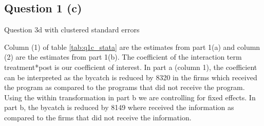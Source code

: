 \documentclass{article}
\begin{document}
\newpage

\subsection{Question 1 (c)}
\begin{table}[ht]
    \centering
    
    \caption{Question 3d with clustered standard errors }
    \label{tab:q1c_stata}
\end{table}
Column (1) of table \ref{tab:q1c_stata} are the estimates from part 1(a) and column (2) are the estimates from part 1(b). The coefficient of the interaction term treatment*post is our coefficient of interest. In part a (column 1), the coefficient can be interpreted as the bycatch is reduced by 8320 in the firms which received the program as compared to the programs that did not receive the program. Using the within transformation in part b we are controlling for fixed effects. In part b, the bycatch is reduced by 8149 where received the information as compared to the firms that did not receive the information.
\end{document}
